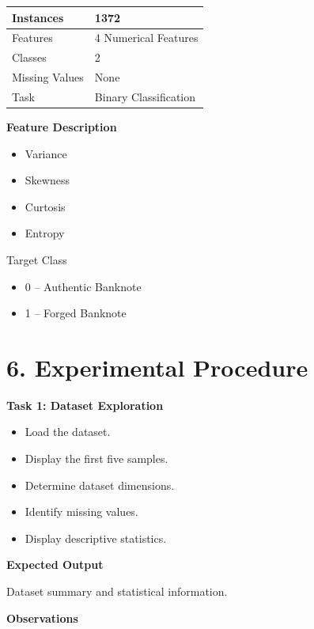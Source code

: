 \documentclass[11pt]{article}
\begin{document}
\begin{center}
\begin{tabular}{|l|l|}
\hline
Instances & 1372\\
\hline
Features & 4 Numerical Features\\
\hline
Classes & 2\\
\hline
Missing Values & None\\
\hline
Task & Binary Classification\\
\hline
\end{tabular}
\end{center}

\textbf{Feature Description}

\begin{itemize}
\item Variance
\item Skewness
\item Curtosis
\item Entropy
\end{itemize}

Target Class

\begin{itemize}
\item 0 -- Authentic Banknote
\item 1 -- Forged Banknote
\end{itemize}


\section*{6. Experimental Procedure}

\textbf{Task 1: Dataset Exploration}

\begin{itemize}
\item Load the dataset.
\item Display the first five samples.
\item Determine dataset dimensions.
\item Identify missing values.
\item Display descriptive statistics.
\end{itemize}

\textbf{Expected Output}

Dataset summary and statistical information.

\vspace{35mm}

\textbf{Observations}
\end{document}
